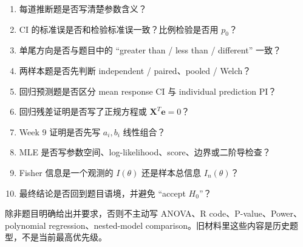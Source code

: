 \documentclass[11pt,a4paper]{article}
\newcommand{\bX}{\mathbf{X}}
\newcommand{\be}{\mathbf{e}}
\begin{document}
\begin{memorybox}[交卷前逐项检查]
\begin{enumerate}
  \item 每道推断题是否写清楚参数含义？
  \item CI 的标准误是否和检验标准误一致？比例检验是否用 $p_0$？
  \item 单尾方向是否与题目中的 “greater than / less than / different” 一致？
  \item 两样本题是否先判断 independent / paired、pooled / Welch？
  \item 回归预测题是否区分 mean response CI 与 individual prediction PI？
  \item 回归残差证明是否写了正规方程或 $\bX^T\be=0$？
  \item Week 9 证明是否先写 $a_i,b_i$ 线性组合？
  \item MLE 是否写参数空间、log-likelihood、score、边界或二阶导检查？
  \item Fisher 信息是一个观测的 $I(\theta)$ 还是样本总信息 $I_n(\theta)$？
  \item 最终结论是否回到题目语境，并避免 “accept $H_0$”？
\end{enumerate}
\end{memorybox}

\begin{warnbox}[不要在期末主动展开的内容]
除非题目明确给出并要求，否则不主动写 ANOVA、R code、P-value、Power、polynomial regression、nested-model comparison。旧材料里这些内容是历史题型，不是当前最高优先级。
\end{warnbox}
\end{document}
